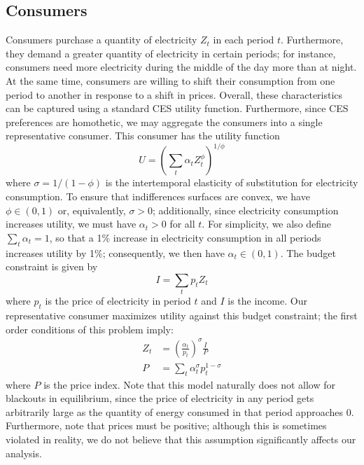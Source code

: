 \documentclass[11pt,a4paper,leqno]{extarticle}
\begin{document}
	
	\subsection{Consumers}
	\label{sec:consumers}
	
	Consumers purchase a quantity of electricity $Z_t$ in each period $t$. Furthermore, they demand a greater quantity of electricity in certain periods; for instance, consumers need more electricity during the middle of the day more than at night. At the same time, consumers are willing to shift their consumption from one period to another in response to a shift in prices. Overall, these characteristics can be captured using a standard CES utility function.  Furthermore, since CES preferences are homothetic, we may aggregate the consumers into a single representative consumer. This consumer has the utility function
	\begin{equation}
	U = \left( \sum_t \alpha_t Z_t^\phi  \right)^{1/\phi}
	\end{equation}
	where $\sigma = 1/(1-\phi)$ is the intertemporal elasticity of substitution for electricity consumption. To ensure that indifferences surfaces are convex, we have $\phi \in (0,1)$ or, equivalently,  $\sigma > 0$; additionally, since electricity consumption increases utility, we must have $\alpha_t > 0$ for all $t$.  For simplicity, we also define $\sum_t \alpha_t = 1$, so that a 1\% increase in electricity consumption in all periods increases utility by 1\%; consequently, we then have $\alpha_t \in (0,1)$. The budget constraint is given by
	\begin{equation}
	I = \sum_t p_t Z_t
	\end{equation}
	where $p_t$ is the price of electricity in period $t$ and $I$ is the income. Our representative consumer maximizes utility against this budget constraint; the first order conditions of this problem imply:
	\begin{align}\label{eq:demand}
	Z_t &= \left(\frac{\alpha_t}{p_t} \right)^\sigma \frac{I}{P} \\
	P &= \sum_t \alpha_t^\sigma p_t^{1-\sigma}
	\end{align}
	where $P$ is the price index. Note that this model naturally does not allow for blackouts in equilibrium, since the price of electricity in any period gets arbitrarily large as the quantity of energy consumed in that period approaches 0. Furthermore, note that prices must be positive; although this is sometimes violated in reality, we do not believe that this assumption significantly affects our analysis. 
	
\end{document}
